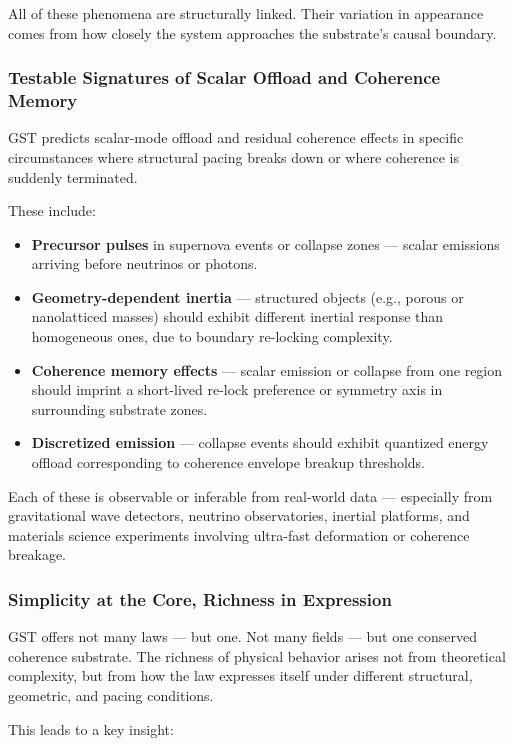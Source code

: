 \documentclass[entropy,article,submit,pdftex,moreauthors]{Definitions/mdpi}
\begin{document}
All of these phenomena are structurally linked. Their variation in appearance comes from how closely the system approaches the substrate’s causal boundary.

\subsubsection*{Testable Signatures of Scalar Offload and Coherence Memory}

GST predicts scalar-mode offload and residual coherence effects in specific circumstances where structural pacing breaks down or where coherence is suddenly terminated.

These include:

\begin{itemize}
    \item \textbf{Precursor pulses} in supernova events or collapse zones — scalar emissions arriving before neutrinos or photons.
    \item \textbf{Geometry-dependent inertia} — structured objects (e.g., porous or nanolatticed masses) should exhibit different inertial response than homogeneous ones, due to boundary re-locking complexity.
    \item \textbf{Coherence memory effects} — scalar emission or collapse from one region should imprint a short-lived re-lock preference or symmetry axis in surrounding substrate zones.
    \item \textbf{Discretized emission} — collapse events should exhibit quantized energy offload corresponding to coherence envelope breakup thresholds.
\end{itemize}

Each of these is observable or inferable from real-world data — especially from gravitational wave detectors, neutrino observatories, inertial platforms, and materials science experiments involving ultra-fast deformation or coherence breakage.

\subsubsection*{Simplicity at the Core, Richness in Expression}

GST offers not many laws — but one. Not many fields — but one conserved coherence substrate. The richness of physical behavior arises not from theoretical complexity, but from how the law expresses itself under different structural, geometric, and pacing conditions.

This leads to a key insight:
\end{document}
